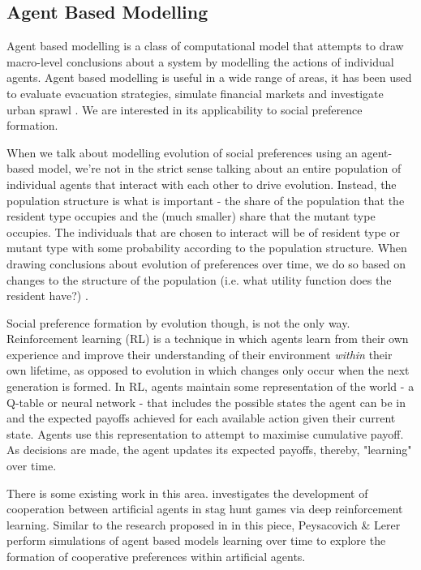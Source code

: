 \documentclass[11pt]{article}
\newcommand*{\np}{\par\noindent\newline}
\begin{document}
\subsection{Agent Based Modelling}\label{abm}
Agent based modelling is a class of computational model that attempts to draw
macro-level conclusions about a system by modelling the actions of individual
agents. Agent based modelling is useful in a wide range of areas, it has been
used to evaluate evacuation strategies\cite{taylor_agent-based_2014}, simulate
financial markets \cite{deissenberg_eurace:_2008} and investigate urban sprawl \cite{brown_effects_2006}. We are interested in its applicability
to social preference formation.

\np When we talk about modelling evolution of social preferences using an
agent-based model, we're not in the strict sense talking about an entire
population of individual agents that interact with each other to drive
evolution. Instead, the population structure is what is important - the share
of the population that the resident type occupies and the (much smaller) share
that the mutant type occupies. The individuals that are chosen to interact will
be of resident type or mutant type with some probability according to the
population structure. When drawing conclusions about evolution of preferences
over time, we do so based on changes to the structure of the population (i.e.
what utility function does the resident have?) \cite{shoham_multiagent_2008}.

\np Social preference formation by evolution though, is not the only way.
Reinforcement learning (RL) is a technique in which agents learn from their own
experience and improve their understanding of their environment \textit{within}
their own lifetime, as opposed to evolution in which changes only occur when
the next generation is formed. In RL, agents maintain some representation of
the world - a Q-table or neural network - that includes the possible states the
agent can be in and the expected payoffs achieved for each available action
given their current state. Agents use this representation to attempt to
maximise cumulative payoff. As decisions are made, the agent updates its expected payoffs, thereby, "learning" over time.

\np There is some existing work in this area.
\cite{peysakhovich_prosocial_2017} investigates the development of cooperation
between artificial agents in stag hunt games via deep reinforcement learning.
Similar to the research proposed in in this piece, Peysacovich \& Lerer perform
simulations of agent based models learning over time to explore the formation
of cooperative preferences within artificial agents.
\end{document}
